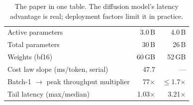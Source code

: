 \begin{table}[h]
\centering
\caption{The paper in one table. The diffusion model's latency
advantage is real; deployment factors limit it in practice.}
\label{tab:summary}
\begin{tabularx}{\linewidth}{@{}L r r@{}}
\toprule
&  &  \\
\midrule
\tabfont Active parameters                            & 3.0\,B & 4.0\,B \\
\tabfont Total parameters                             & 30\,B & 26\,B \\
\tabfont Weights (bf16)                                & 60\,GB & 52\,GB \\
\tabfont Cost law slope (ms/token, serial) & 47.7 & --- \\
\tabfont Batch-1 $\to$ peak throughput multiplier     & 77$\times$ & $\leq$1.7$\times$ \\
\tabfont Tail latency (max/median)                    & 1.03$\times$ & 3.21$\times$ \\
\bottomrule
\end{tabularx}
\end{table}
